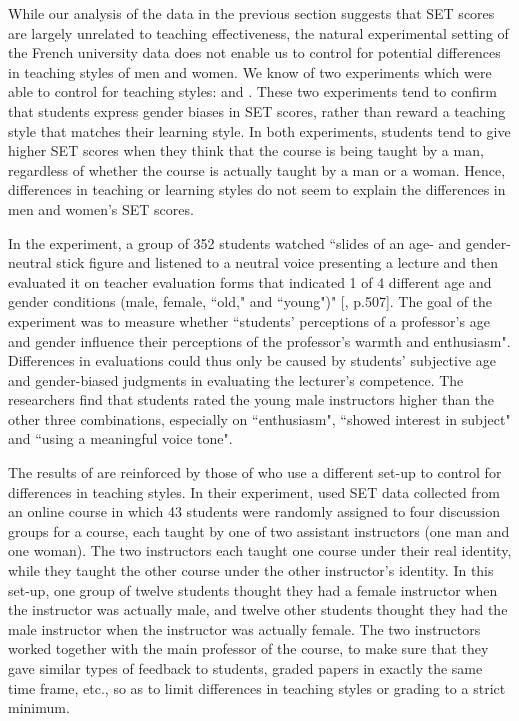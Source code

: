 \documentclass[12pt]{article}
\begin{document}
While our analysis of the data in the previous section suggests that SET scores are largely unrelated to teaching effectiveness, the natural experimental setting of the French university data does not enable us to control for potential differences in teaching styles of men and women. We know of two experiments which were able to control for teaching styles: \citet{Arbuckle2003} and \citet{MacNell2014}. These two experiments tend to confirm that students express gender biases in SET scores, rather than reward a teaching style that matches their learning style. In both experiments, students tend to give higher SET scores when they think that the course is being taught by a man, regardless of whether the course is actually taught by a man or a woman. Hence, differences in teaching or learning styles do not seem to explain the differences in men and women's SET scores.

In the \citet{Arbuckle2003} experiment, a group of 352 students watched \textquotedblleft slides of an age- and gender-neutral stick figure and listened to a neutral voice presenting a lecture and then evaluated it on teacher evaluation forms that indicated 1 of 4 different age and gender conditions (male, female, \textquotedblleft old," and \textquotedblleft young")" [\citealp{Arbuckle2003}, p.507]. 
The goal of the experiment was to measure whether \textquotedblleft students' perceptions of a professor's age and gender influence their perceptions of the professor's warmth and enthusiasm". Differences in evaluations could thus only be caused by students' subjective age and gender-biased judgments in evaluating the lecturer's competence. The researchers find that students rated the young male instructors higher than the other three combinations, especially on \textquotedblleft enthusiasm", \textquotedblleft showed interest in subject"  and \textquotedblleft using a meaningful voice tone". 

The results of \citet{Arbuckle2003} are reinforced by those of \citet{MacNell2014} who use a different set-up to control for differences in teaching styles. In their experiment, \citet{MacNell2014} used SET data collected from an online course in which 43 students were randomly assigned to four discussion groups for a course, each taught by one of two assistant instructors (one man and one woman). The two instructors each taught one course under their real identity, while they taught the other course under the other instructor's identity. In this set-up, one group of twelve students thought they had a female instructor when the instructor was actually male, and twelve other students thought they had the male instructor when the instructor was actually female. The two instructors worked together with the main professor of the course, to make sure that they gave similar types of feedback to students, graded papers in exactly the same time frame, etc., so as to limit differences in teaching styles or grading to a strict minimum. 
\end{document}
